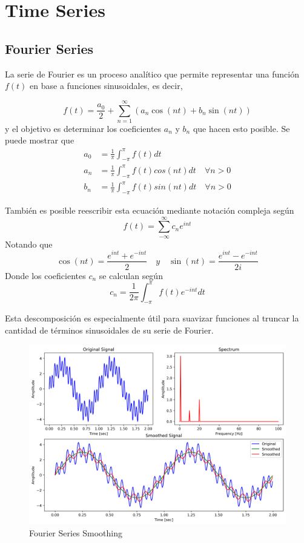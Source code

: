 \chapter{Time Series}

\section{Fourier Series}

La serie de Fourier es un proceso analítico que permite representar una función $f(t)$ en base a funciones sinusoidales, es decir, 

$$
f(t) = \frac{a_0}{2} + \sum_{n=1}^{\infty} (a_n \cos(nt) + b_n \sin(nt))
$$
y el objetivo es determinar los coeficientes $a_n$ y $b_n$ que hacen esto posible. Se puede mostrar que
\begin{equation*}
\begin{aligned}
a_0 &= \frac{1}{\pi}\int_{-\pi}^{\pi} f(t)dt \\
a_n &= \frac{1}{\pi}\int_{-\pi}^{\pi} f(t)cos(nt)dt \quad \forall n > 0 \\ 
b_n &= \frac{1}{\pi}\int_{-\pi}^{\pi} f(t)sin(nt)dt \quad \forall n > 0
\end{aligned}
\end{equation*}

También es posible reescribir esta ecuación mediante notación compleja según 
$$ 
f(t) = \sum_{-\infty}^{\infty} c_n e^{int}
$$
Notando que 
$$ 
\cos(nt) = \frac{e^{int} + e^{-int}}{2} \quad y \quad \sin(nt) = \frac{e^{int} - e^{-int}}{2i} 
$$
Donde los coeficientes $c_n$ se calculan según 
$$
c_n = \frac{1}{2\pi}\int_{-\pi}^{\pi}f(t)e^{-int}dt
$$

Esta descomposición es especialmente útil para suavizar funciones al truncar la cantidad de términos sinusoidales de su serie de Fourier. 

\begin{figure}[H]
    \center
    \includegraphics[scale=0.5]{notebooks/TS/img/fourier_transform_smoothing.png}
    \caption{Fourier Series Smoothing}
\end{figure}

